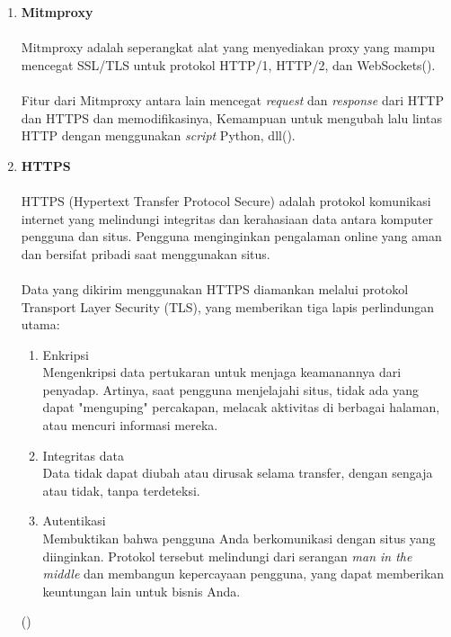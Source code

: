 \documentclass[../PROPOSAL_PRA_SKRIPSI_ALDZIKRI_DWIJAYANTO_PRATHAMA.tex]{subfiles}
\begin{document}
\begin{enumerate}[label=\textbf{\arabic*.}]
  \item \textbf{Mitmproxy}
  \paragraph*{}Mitmproxy adalah seperangkat alat yang
  menyediakan proxy yang mampu mencegat SSL/TLS untuk
  protokol HTTP/1, HTTP/2, dan WebSockets(\cite{mitm}).

  \paragraph*{}Fitur dari Mitmproxy antara lain mencegat
  \textit{request} dan \textit{response} dari  HTTP dan
  HTTPS dan memodifikasinya, Kemampuan untuk mengubah lalu
  lintas HTTP dengan menggunakan \textit{script} Python,
  dll(\cite{mitm}).

  \item \textbf{HTTPS}
  \paragraph*{}HTTPS (Hypertext Transfer Protocol Secure)
  adalah protokol komunikasi internet yang melindungi
  integritas dan kerahasiaan data antara komputer pengguna
  dan situs. Pengguna menginginkan pengalaman online yang
  aman dan bersifat pribadi saat menggunakan situs.

  \paragraph*{}Data yang dikirim menggunakan HTTPS diamankan
  melalui protokol Transport Layer Security (TLS), yang
  memberikan tiga lapis perlindungan utama:
  \begin{enumerate}
    \item Enkripsi\\
      Mengenkripsi data pertukaran untuk menjaga keamanannya
      dari penyadap. Artinya, saat pengguna menjelajahi
      situs, tidak ada yang dapat "menguping" percakapan,
      melacak aktivitas di berbagai halaman, atau mencuri
      informasi mereka.
    \item Integritas data\\
      Data tidak dapat diubah atau dirusak selama transfer,
      dengan sengaja atau tidak, tanpa terdeteksi.
    \item Autentikasi\\
      Membuktikan bahwa pengguna Anda berkomunikasi dengan
      situs yang diinginkan. Protokol tersebut melindungi
      dari serangan \textit{man in the middle} dan membangun
      kepercayaan pengguna, yang dapat memberikan keuntungan
      lain untuk bisnis Anda.
  \end{enumerate}
  (\cite{googledev-https})


\end{enumerate}
\end{document}
